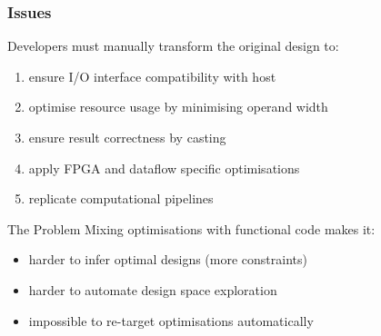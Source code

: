 \begin{frame}[fragile]
  \frametitle{Issues}
  Developers must manually transform the original design to:
  \begin{enumerate}
  \item ensure I/O interface compatibility with host
  \item optimise resource usage by minimising operand width
  \item ensure result correctness by casting
  \item apply FPGA and dataflow specific optimisations
  \item replicate computational pipelines
  \end{enumerate}
\vspace{0.5cm}
  \begin{beamerboxesrounded}{The Problem}
    Mixing optimisations with functional code makes it:
    \begin{itemize}
    \item harder to infer optimal designs (more constraints)
    \item harder to automate design space exploration
    \item impossible to re-target optimisations automatically
    \end{itemize}
  \end{beamerboxesrounded}
\end{frame}
